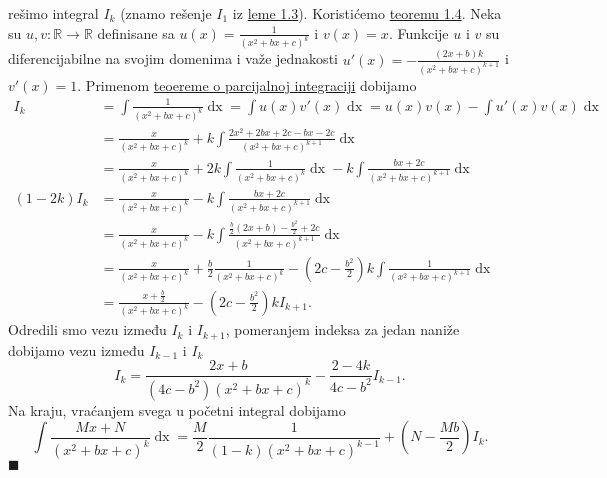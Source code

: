 \documentclass{article}
\DeclareMathOperator{\dx}{dx}
\begin{document}
rešimo integral $I_k$ (znamo rešenje $I_1$ iz \hyperref[lema_1.3]{leme 1.3}). Koristićemo \hyperref[teorema_1.4]{teoremu 1.4}.
Neka su $u,v:\mathbb{R}\longrightarrow\mathbb{R}$ definisane sa $\displaystyle u\left(x\right)=\frac{1}{\left(x^2+bx+c\right)^k}$
i $v\left(x\right)=x$. Funkcije $u$ i $v$ su diferencijabilne na svojim domenima i
važe jednakosti $\displaystyle u'\left(x\right)=-\frac{\left(2x+b\right)k}{\left(x^2+bx+c\right)^{k+1}}$ i $v'\left(x\right)=1$.
Primenom \hyperref[teorema_1.4]{teoereme o parcijalnoj integraciji} dobijamo
\begin{align*}
    I_k                  & =\int\frac{1}{\left(x^2+bx+c\right)^k}\dx =\int u\left(x\right)v'\left(x\right)\dx =u\left(x\right)v\left(x\right)-\int u'\left(x\right)v\left(x\right)\dx    \\
                         & =\frac{x}{\left(x^2+bx+c\right)^k}+k\int\frac{2x^2+2bx+2c-bx-2c}{\left(x^2+bx+c\right)^{k+1}} \dx                                                             \\
                         & =\frac{x}{\left(x^2+bx+c\right)^k}+2k\int\frac{1}{\left(x^2+bx+c\right)^k}\dx-k\int\frac{bx+2c}{\left(x^2+bx+c\right)^{k+1}} \dx                              \\
    \left(1-2k\right)I_k & =\frac{x}{\left(x^2+bx+c\right)^k}-k\int\frac{bx+2c}{\left(x^2+bx+c\right)^{k+1}} \dx                                                                         \\
                         & =\frac{x}{\left(x^2+bx+c\right)^k}-k\int\frac{\frac{b}{2}\left(2x+b\right)-\frac{b^2}{2}+2c}{\left(x^2+bx+c\right)^{k+1}} \dx                                 \\
                         & =\frac{x}{\left(x^2+bx+c\right)^k}+\frac{b}{2}\frac{1}{\left(x^2+bx+c\right)^{k}}-\left(2c-\frac{b^2}{2}\right)k\int\frac{1}{\left(x^2+bx+c\right)^{k+1}} \dx \\
                         & =\frac{x+\frac{b}{2}}{\left(x^2+bx+c\right)^k}-\left(2c-\frac{b^2}{2}\right)kI_{k+1}.
\end{align*}
Odredili smo vezu između $I_k$ i $I_{k+1}$, pomeranjem indeksa za jedan
naniže dobijamo vezu između $I_{k-1}$ i $I_k$
$$I_k =\frac{2x+b}{\left(4c-b^2\right)\left(x^2+bx+c\right)^k}-\frac{2-4k}{4c-b^2}I_{k-1}.$$
Na kraju, vraćanjem svega u početni integral dobijamo
$$    \int \frac{Mx+N}{\left(x^2+bx+c\right)^k}\dx=\frac{M}{2}\frac{1}{\left(1-k\right)\left(x^2+bx+c\right)^{k-1}}+\left(N-\frac{Mb}{2}\right)I_k.$$
\null\hfill $\blacksquare$\par
\end{document}
